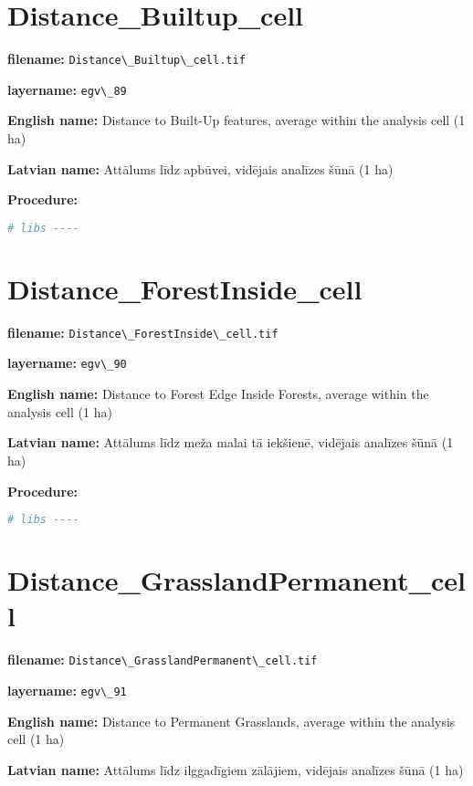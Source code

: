 \documentclass[
]{book}
\newcommand{\passthrough}[1]{#1}
\begin{document}
\section{Distance\_Builtup\_cell}\label{ch06.089}

\textbf{filename:} \passthrough{\lstinline!Distance\_Builtup\_cell.tif!}

\textbf{layername:} \passthrough{\lstinline!egv\_89!}

\textbf{English name:} Distance to Built-Up features, average within the analysis cell (1 ha)

\textbf{Latvian name:} Attālums līdz apbūvei, vidējais analīzes šūnā (1 ha)

\textbf{Procedure:}

\begin{lstlisting}[language=R]
# libs ----
\end{lstlisting}

\section{Distance\_ForestInside\_cell}\label{ch06.090}

\textbf{filename:} \passthrough{\lstinline!Distance\_ForestInside\_cell.tif!}

\textbf{layername:} \passthrough{\lstinline!egv\_90!}

\textbf{English name:} Distance to Forest Edge Inside Forests, average within the analysis cell (1 ha)

\textbf{Latvian name:} Attālums līdz meža malai tā iekšienē, vidējais analīzes šūnā (1 ha)

\textbf{Procedure:}

\begin{lstlisting}[language=R]
# libs ----
\end{lstlisting}

\section{Distance\_GrasslandPermanent\_cell}\label{ch06.091}

\textbf{filename:} \passthrough{\lstinline!Distance\_GrasslandPermanent\_cell.tif!}

\textbf{layername:} \passthrough{\lstinline!egv\_91!}

\textbf{English name:} Distance to Permanent Grasslands, average within the analysis cell (1 ha)

\textbf{Latvian name:} Attālums līdz ilggadīgiem zālājiem, vidējais analīzes šūnā (1 ha)
\end{document}
